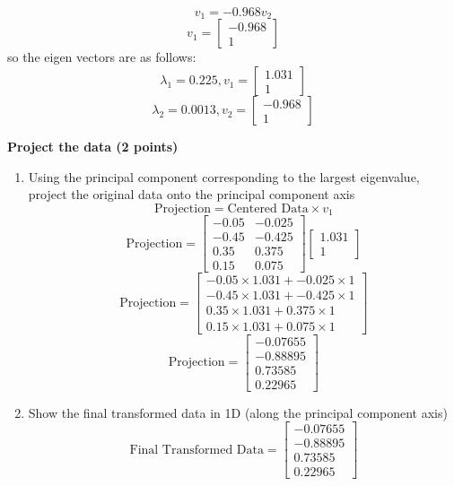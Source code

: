 \documentclass[a3paper,12pt]{extarticle} %
\begin{document}
\begin{enumerate}
\begin{enumerate}
\[        v_1 = -0.968v_2
        \]
        \[
        v_1 = \begin{bmatrix}-0.968\\1\end{bmatrix}
        \]
        so the eigen vectors are as follows:
        \[
        \lambda_1 = 0.225, v_1 = \begin{bmatrix}1.031\\1\end{bmatrix}
        \]
        \[
        \lambda_2 = 0.0013, v_2 = \begin{bmatrix}-0.968\\1\end{bmatrix}
        \]
    \end{enumerate}
    \subitem \textbf{Project the data (2 points)}
    \begin{enumerate}
        \item Using the principal component corresponding to the largest eigenvalue, project the original data onto the principal component axis
        \[
        \text{Projection} = \text{Centered Data} \times v_1
        \]
        \[
        \text{Projection} = \begin{bmatrix}-0.05 & -0.025\\-0.45 & -0.425\\0.35 & 0.375\\0.15 & 0.075\end{bmatrix} \begin{bmatrix}1.031\\1\end{bmatrix}
        \]
        \[
        \text{Projection} = \begin{bmatrix}-0.05 \times 1.031 + -0.025 \times 1\\-0.45 \times 1.031 + -0.425 \times 1\\0.35 \times 1.031 + 0.375 \times 1\\0.15 \times 1.031 + 0.075 \times 1\end{bmatrix}
        \]
        \[
        \text{Projection} = \begin{bmatrix}-0.07655\\-0.88895\\0.73585\\0.22965\end{bmatrix}
        \]
        \item Show the final transformed data in 1D (along the principal component axis)
        \[
        \text{Final Transformed Data} = \begin{bmatrix}-0.07655\\-0.88895\\0.73585\\0.22965\end{bmatrix}
\]
\end{enumerate}
\end{enumerate}
\end{document}

